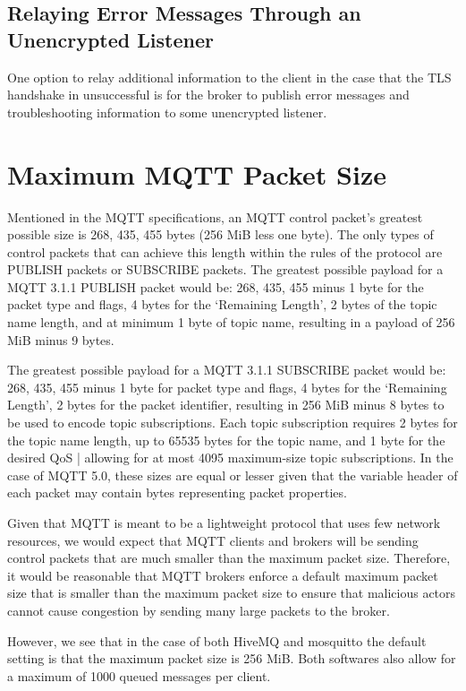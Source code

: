 \documentclass[12pt]{article}
\begin{document}
\subsection{Relaying Error Messages Through an Unencrypted Listener}
One option to relay additional information to the client in the case that the TLS handshake in unsuccessful is for the broker to publish error messages and troubleshooting information to some unencrypted listener. 

\section{Maximum MQTT Packet Size}
Mentioned in the MQTT specifications, an MQTT control packet's greatest possible size is 268, 435, 455 bytes (256 MiB less one byte). The only types of control packets that can achieve this length within the rules of the protocol are PUBLISH packets or SUBSCRIBE packets. The greatest possible payload for a MQTT 3.1.1 PUBLISH packet would be: 268, 435, 455 minus 1 byte for the packet type and flags, 4 bytes for the `Remaining Length', 2 bytes of the topic name length, and at minimum 1 byte of topic name, resulting in a payload of 256 MiB minus 9 bytes.\par
The greatest possible payload for a MQTT 3.1.1 SUBSCRIBE packet would be: 268, 435, 455 minus 1 byte for packet type and flags, 4 bytes for the `Remaining Length', 2 bytes for the packet identifier, resulting in 256 MiB minus 8 bytes to be used to encode topic subscriptions. Each topic subscription requires 2 bytes for the topic name length, up to 65535 bytes for the topic name, and 1 byte for the desired QoS | allowing for at most 4095 maximum-size topic subscriptions. In the case of MQTT 5.0, these sizes are equal or lesser given that the variable header of each packet may contain bytes representing packet properties.\par
Given that MQTT is meant to be a lightweight protocol that uses few network resources, we would expect that MQTT clients and brokers will be sending control packets that are much smaller than the maximum packet size. Therefore, it would be reasonable that MQTT brokers enforce a default maximum packet size that is smaller than the maximum packet size to ensure that malicious actors cannot cause congestion by sending many large packets to the broker. \par
However, we see that in the case of both HiveMQ and mosquitto the default setting is that the maximum packet size is 256 MiB. Both softwares also allow for a maximum of 1000 queued messages per client. 
\end{document}
